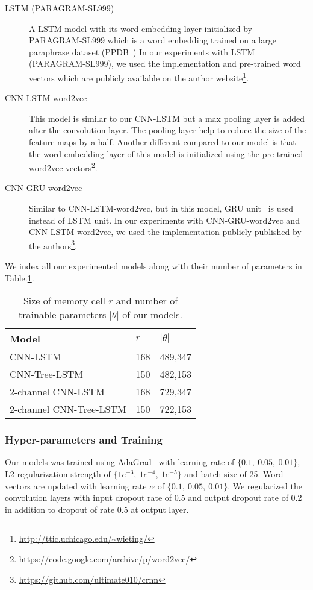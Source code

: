 \begin{description}
	\item[LSTM (PARAGRAM-SL999)~\cite{wieting2015towards}] A LSTM model with its word embedding layer initialized by PARAGRAM-SL999 which is a word embedding trained on a large paraphrase dataset (PPDB~\cite{ganitkevitch2013ppdb})
	In our experiments with LSTM (PARAGRAM-SL999), we used the implementation and pre-trained word vectors which are publicly available on the author website\footnote{\url{http://ttic.uchicago.edu/~wieting/}}.
	\item [CNN-LSTM-word2vec~\cite{cnn-rnn}] This model is similar to our CNN-LSTM but a max pooling layer is added after the convolution layer.  
	The pooling layer help to reduce the size of the feature maps by a half.
	Another different compared to our model is that the word embedding layer of this model is initialized using the pre-trained word2vec vectors\footnote{\url{https://code.google.com/archive/p/word2vec/}}.
	\item [CNN-GRU-word2vec~\cite{cnn-rnn}] Similar to CNN-LSTM-word2vec, but in this model, GRU unit~\cite{gru} is used instead of LSTM unit.
	In our experiments with CNN-GRU-word2vec and CNN-LSTM-word2vec, we used the implementation publicly published by the authors\footnote{\url{https://github.com/ultimate010/crnn}}.
\end{description}
We index all our experimented models along with their number of parameters in Table.\ref{table:paramtable}.
\begin{table}[H]
	\centering
	\caption{Size of memory cell \(r\) and number of trainable parameters \(\left\vert{\theta}\right\vert\) of our models. 
	}
	\label{table:paramtable}
	\begin{tabular}{|l|l|l|}
		\hline
		Model & \(r\) & \(\left\vert{\theta}\right\vert\) \\ \hline
		CNN-LSTM                 & 168         & 489,347          \\
		CNN-Tree-LSTM            & 150         & 482,153          \\
		2-channel CNN-LSTM       & 168         & 729,347          \\
		2-channel CNN-Tree-LSTM  & 150         & 
		722,153 \\
		\hline
	\end{tabular}
\end{table}
\subsubsection{Hyper-parameters and Training}
Our models was trained using AdaGrad~\cite{duchi2011adaptive} with learning rate of $\{0.1,~ 0.05,~ 0.01\}$, L2 regularization strength of $\{1e^{-3},~ 1e^{-4}, ~ 1e^{-5} \}$ and batch size of 25.
Word vectors are updated with learning rate $\alpha$ of $\{0.1,~0.05, ~0.01\}$.
We regularized the convolution layers with input dropout rate of 0.5 and output dropout rate of 0.2 in addition to dropout of rate 0.5 at output layer.

